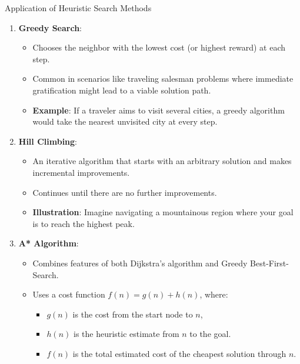 \documentclass[aspectratio=169]{beamer}
\begin{document}
\begin{frame}[fragile]{Application of Heuristic Search Methods}
    \begin{enumerate}
        \item \textbf{Greedy Search}:
        \begin{itemize}
            \item Chooses the neighbor with the lowest cost (or highest reward) at each step.
            \item Common in scenarios like traveling salesman problems where immediate gratification might lead to a viable solution path.
            \item \textbf{Example}: If a traveler aims to visit several cities, a greedy algorithm would take the nearest unvisited city at every step.
        \end{itemize}

        \item \textbf{Hill Climbing}:
        \begin{itemize}
            \item An iterative algorithm that starts with an arbitrary solution and makes incremental improvements.
            \item Continues until there are no further improvements.
            \item \textbf{Illustration}: Imagine navigating a mountainous region where your goal is to reach the highest peak.
        \end{itemize}
        
        \item \textbf{A* Algorithm}:
        \begin{itemize}
            \item Combines features of both Dijkstra’s algorithm and Greedy Best-First-Search.
            \item Uses a cost function \(f(n) = g(n) + h(n)\), where:
            \begin{itemize}
                \item \(g(n)\) is the cost from the start node to \(n\),
                \item \(h(n)\) is the heuristic estimate from \(n\) to the goal.
                \item \(f(n)\) is the total estimated cost of the cheapest solution through \(n\).
            \end{itemize}
        \end{itemize}
    \end{enumerate}
\end{frame}
\end{document}
